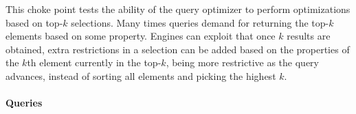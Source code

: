 
This choke point tests the ability of the query optimizer to perform
optimizations based on top-$k$ selections. Many times queries demand for
returning the top-$k$ elements based on some property. Engines can exploit that
once $k$ results are obtained, extra restrictions in a selection can be added
based on the properties of the $k$th element currently in the top-$k$, being
more restrictive as the query advances, instead of sorting all elements and
picking the highest $k$.


\paragraph{Queries}
{\raggedright
}